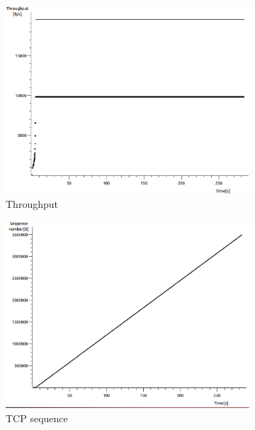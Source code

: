 \documentclass[conference,a4paper]{IEEEtran}
\begin{document}
\begin{figure}
 \centering
 \begin{subfigure}[b]{0.2\textwidth}
  \includegraphics[width=\textwidth]{s7-2_th}
  \caption{Throughput}
 \end{subfigure}
 \begin{subfigure}[b]{0.2\textwidth}
  \includegraphics[width=\textwidth]{s7-2_seq}
  \caption{TCP sequence}
 \end{subfigure}
 \begin{subfigure}[b]{0.2\textwidth}

\end{subfigure}
\end{figure}
\end{document}

